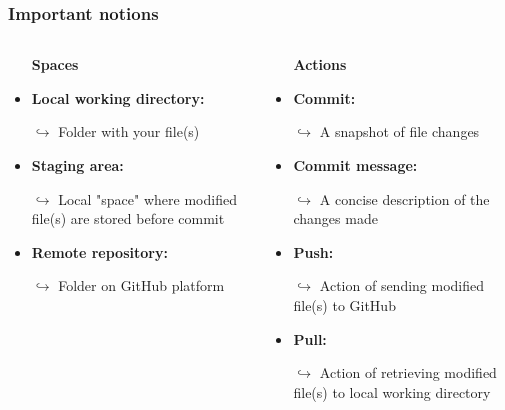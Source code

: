 \documentclass[xcolor=x11names,compress]{beamer}
\renewcommand{\(}{\begin{columns}}
\renewcommand{\)}{\end{columns}}
\newcommand{\<}[1]{\begin{column}{#1}}
\renewcommand{\>}{\end{column}}
\begin{document}
\begin{frame}
\frametitle{Important notions}
\begin{columns}[t]
 \begin{column}{0.5\textwidth}
    \begin{itemize}[<+->]
     \item[]
   \begin{center}
    \textcolor{brique}{\textbf{Spaces}}
   \end{center}
    \item  \textcolor{siap}{\textbf{Local working directory:}}
    \item[$\hookrightarrow$] Folder with your file(s)
    \item  \textcolor{siap}{\textbf{Staging area:}}
    \item[$\hookrightarrow$] Local "space" where modified file(s) are stored before commit
    \item \textcolor{siap}{\textbf{Remote repository:}}
    \item[$\hookrightarrow$] Folder  on GitHub platform
    \end{itemize}
 \end{column}
 \begin{column}{0.5\textwidth}
    \begin{itemize}[<+->]
        \item[] 
        \begin{center}
        \textcolor{brique}{\textbf{Actions}}
        \end{center}
        \item \textcolor{siap}{\textbf{Commit:}}
        \item[$\hookrightarrow$] A snapshot of file changes
        \item \textcolor{siap}{\textbf{Commit message:}}
        \item[$\hookrightarrow$] A concise description of the changes made
        \item \textcolor{siap}{\textbf{Push:}}
        \item[$\hookrightarrow$] Action of sending modified file(s) to GitHub
        \item \textcolor{siap}{\textbf{Pull:}}
        \item[$\hookrightarrow$] Action of retrieving modified file(s) to local working directory

        
    \end{itemize}
 \end{column}
\end{columns}
\end{frame}
\end{document}
